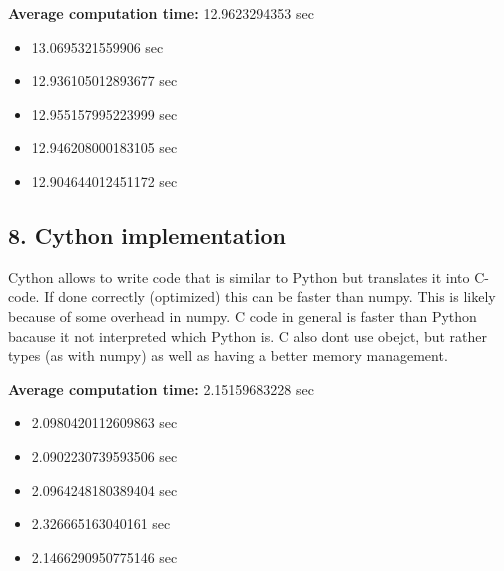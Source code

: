 \documentclass[a4paper]{article}
\begin{document}
\textbf{Average computation time: }12.9623294353 sec
\begin{itemize}  
\item 13.0695321559906 sec
\item 12.936105012893677 sec
\item 12.955157995223999 sec
\item 12.946208000183105 sec
\item 12.904644012451172 sec
\end{itemize}

\subsection*{8. Cython implementation}
\begin{flushleft}                           
Cython allows to write code that is similar to Python but translates it into C-code. If done correctly (optimized) this can be faster than numpy. This is likely because of some overhead in numpy. C code in general is faster than Python bacause it not interpreted which Python is. C also dont use obejct, but rather types (as with numpy) as well as having a better memory management.
\end{flushleft}                           

\textbf{Average computation time: }2.15159683228 sec
\begin{itemize}  
\item 2.0980420112609863 sec
\item 2.0902230739593506 sec
\item 2.0964248180389404 sec
\item 2.326665163040161 sec
\item 2.1466290950775146 sec
\end{itemize}
\end{document}

